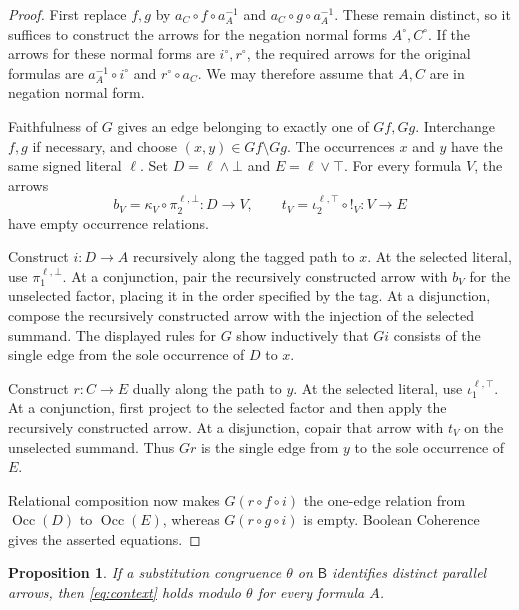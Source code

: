 \documentclass[11pt]{article}
\newtheorem{proposition}[theorem]{Proposition}
\newcommand{\B}{\mathsf B}
\newcommand{\Occ}{\operatorname{Occ}}
\begin{document}
\begin{proof}
First replace $f,g$ by $a_C\circ f\circ a_A^{-1}$ and
$a_C\circ g\circ a_A^{-1}$. These remain distinct, so it suffices to
construct the arrows for the negation normal forms $A^\circ,C^\circ$.
If the arrows for these normal forms are $i^\circ,r^\circ$, the required
arrows for the original formulas are
$a_A^{-1}\circ i^\circ$ and $r^\circ\circ a_C$.
We may therefore assume that $A,C$ are in negation normal form.

Faithfulness of $G$ gives an edge belonging to exactly one of $Gf,Gg$.
Interchange $f,g$ if necessary, and choose
$(x,y)\in Gf\setminus Gg$. The occurrences $x$ and $y$ have the same
signed literal $\ell$. Set $D=\ell\wedge\bot$ and $E=\ell\vee\top$.
For every formula $V$, the arrows
\[
 b_V=\kappa_V\circ\pi_2^{\ell,\bot}:D\to V,
 \qquad
 t_V=\iota_2^{\ell,\top}\circ!_V:V\to E
\]
have empty occurrence relations.

Construct $i:D\to A$ recursively along the tagged path
to $x$. At the selected literal, use $\pi_1^{\ell,\bot}$.
At a conjunction, pair the recursively constructed arrow with $b_V$
for the unselected factor, placing it in the order specified by the
tag. At a disjunction, compose the recursively constructed arrow
with the injection of the selected summand. The displayed rules for
$G$ show inductively that $Gi$ consists of the single edge from the
sole occurrence of $D$ to $x$.

Construct $r:C\to E$ dually along the path to $y$.
At the selected literal, use $\iota_1^{\ell,\top}$.
At a conjunction, first project to the selected factor and then apply
the recursively constructed arrow. At a disjunction, copair that
arrow with $t_V$ on the unselected summand. Thus $Gr$ is the single
edge from $y$ to the sole occurrence of $E$.

Relational composition now makes $G(r\circ f\circ i)$ the one-edge
relation from $\Occ(D)$ to $\Occ(E)$, whereas
$G(r\circ g\circ i)$ is empty. Boolean Coherence gives the asserted
equations.
\end{proof}

\begin{proposition}\label{prop:all-contexts}
If a substitution congruence $\theta$ on $\B$ identifies distinct
parallel arrows, then \eqref{eq:context} holds modulo $\theta$ for
every formula $A$.
\end{proposition}
\end{document}
